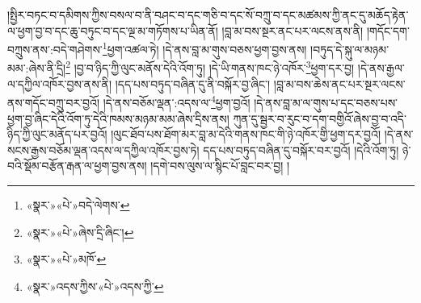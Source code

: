 །སྤྱིར་བཏང་བ་དམིགས་ཀྱིས་བསལ་བ་ནི་བཤང་བ་དང་གཅི་བ་དང་སོ་བཀྲུ་བ་དང་མཚམས་ཀྱི་ནང་དུ་མཆོད་རྟེན་ལ་ཕྱག་བྱ་བ་དང་ཆུ་བཏུང་བ་དང་ལྔ་མ་གཏོགས་པ་ཡིན་ནོ། །བླ་མ་བས་སྔར་ནང་པར་ལངས་ནས་ནི། །གདོང་དག་བཀྲུས་ནས་:བདེ་གཤེགས་\footnote{«སྣར་»«པེ་»བདེ་ལེགས་}ཕྱག་འཚལ་ཏེ། །དེ་ནས་བླ་མ་གུས་བཅས་ཕྱག་བྱས་ནས། །བཏུད་དེ་སྐུ་ལ་མཉམ་མམ་:ཞེས་ནི་དྲི།\footnote{«སྣར་»«པེ་»ཞེས་དྲི་ཞིང་།} །བྱ་བ་ཉིད་ཀྱི་ལུང་མནོས་དེའི་འོག་ཏུ། །དེ་ཡི་གནས་ཁང་ཉེ་འཁོར་\footnote{«སྣར་»«པེ་»མཁོ་}ཕྱག་དར་བྱ། །དེ་ནས་རྒྱལ་ལ་དཀྱིལ་འཁོར་བྱས་ནས་ནི། །དད་པས་བཏུད་བཞིན་དུ་ནི་བསྐོར་བྱ་ཞིང་། །བླ་མ་བས་ཆེས་ནང་པར་སྔར་ལངས་ནས་གདོང་བཀྲུ་བར་བྱའོ། །དེ་ནས་བཅོམ་ལྡན་:འདས་ལ་\footnote{«སྣར་»འདས་ཀྱིས་«པེ་»འདས་ཀྱི་}ཕྱག་བྱའོ། །དེ་ནས་བླ་མ་ལ་གུས་པ་དང་བཅས་པས་ཕྱག་བྱ་ཞིང་དེའི་འོག་ཏུ་དེའི་ཁམས་མཉམ་མམ་ཞེས་དྲིས་ནས། ཀུན་དུ་སྦྱར་བ་རུང་བ་དག་བགྱིའོ་ཞེས་བྱ་བ་འདི་ཉིད་ཀྱི་ལུང་མནོད་པར་བྱའོ། །ལུང་ཐོབ་པས་ཐོག་མར་བླ་མ་དེའི་གནས་ཁང་གི་ཉེ་འཁོར་གྱི་ཕྱག་དར་བྱའོ། །དེ་ནས་སངས་རྒྱས་བཅོམ་ལྡན་འདས་ལ་དཀྱིལ་འཁོར་བྱས་ཏེ། དད་པས་བཏུད་བཞིན་དུ་བསྐོར་བར་བྱའོ། །དེའི་འོག་ཏུ། ཉེ་བའི་སྡོམ་བརྩོན་རྒན་ལ་ཕྱག་བྱས་ནས། །དགེ་བས་ལུས་ལ་སྙིང་པོ་བླང་བར་བྱ། །
